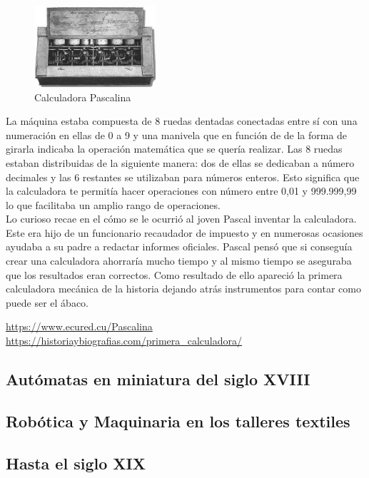 \documentclass[paper=a4, fontsize=11pt]{scrartcl}
\begin{document}
\begin{figure}[H]
\begin{center}
  \includegraphics[width=0.4\textwidth]{imagenes/cp.jpg}
  \caption{Calculadora Pascalina}
  \label{cp}
\end{center}
\end{figure}

La máquina estaba compuesta de 8 ruedas dentadas conectadas entre sí con una numeración en ellas de 0 a 9 y una manivela que en función de de la forma de girarla indicaba la operación matemática que se quería realizar. Las 8 ruedas estaban distribuidas de la siguiente manera: dos de ellas se dedicaban a número decimales y las 6 restantes se utilizaban para números enteros. Esto significa que la calculadora te permitía hacer operaciones con número entre 0,01 y 999.999,99 lo que facilitaba un amplio rango de operaciones.\\

Lo curioso recae en el cómo se le ocurrió al joven Pascal inventar la calculadora. Este era hijo de un funcionario recaudador de impuesto y en numerosas ocasiones ayudaba a su padre a redactar informes oficiales. Pascal pensó que si conseguía crear una calculadora ahorraría mucho tiempo y al mismo tiempo se aseguraba que los resultados eran correctos. Como resultado de ello apareció la primera calculadora mecánica de la historia dejando atrás instrumentos para contar como puede ser el ábaco.

\url{https://www.ecured.cu/Pascalina}
\url{https://historiaybiografias.com/primera\_calculadora/}

\subsection{Autómatas en miniatura del siglo XVIII}

\subsection{Robótica y Maquinaria en los talleres textiles}

\subsection{Hasta el siglo XIX}
\end{document}
